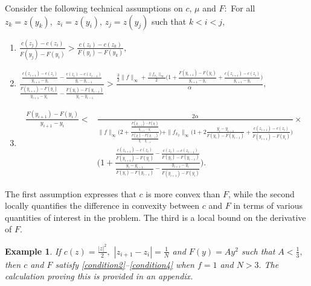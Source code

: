 \documentclass[12pt,reqno]{amsart}
\newtheorem{example}{Example}
\begin{document}
Consider the following  technical assumptions on $c$, $\mu$ and $F:$ 
For all $z_k=z(y_k),\,\,z_i=z(y_i),\,z_j=z(y_j)$ such that $k<  i< j,$ 
\begin{enumerate}[label={(H\arabic*)}]
\item \label{condition2} $ \frac{c(z_j)-c(z_i)}{F(y_j)-F(y_i)}>\frac{c(z_i)-c(z_k)}{F(y_i)-F(y_k)},$\vspace{3pt}
  \item \label{condition3} $\frac{\frac{c(z_{i+1})-c(z_i)}{y_{i+1}-y_i}-\frac{c(z_i)-c(z_
  {i-1})}{y_i-y_{i-1}}}{\frac{F(y_{i+1})-F(y_i)}{y_{i+1}-y_i}-\frac{F(y_i)-F(y_{i-1})}{y_i-y_{i-1}}}>\frac{\frac{3}{2}\|f\|_\infty+\frac{\|f_{x_1}\|_\infty}{2}\Big(1+\frac{F(y_{i+1})-F(y_i)}{y_{i+1}-y_i} +\frac{c(z_{i+1})-c(z_i)}{y_{i+1}-y_i}\Big)}{\alpha},$
  
   \item \label{condition4} 
   \[\begin{array}{ll}
   \frac{F(y_{i+1})-F(y_{i})}{y_{i+1}-y_{i}}<&  \frac{2\alpha}{\|f\|_\infty\Big(2+\frac{\frac{F(y_{i+1})-F(y_{i})}{y_{i+1}-y_{i}}}{\frac{F(y_i)-F(y_{i-1})}{y_i-y_{i-1}}}\Big)+\|f_{x_2}\|_\infty\Big(1+2\frac{y_{i}-y_{i-1}}{F(y_{i})-F(y_{i-1})}+\frac{c(z_{i+1})-c(z_i)}{F(y_{i+1})-F(y_i)}\Big)}\times\\
   &\Bigg(1+\frac{\frac{c(z_{i+1})-c(z_i)}{F(y_{i+1})-F(y_i)}-\frac{c(z_{i})-c(z_{i-1})}{F(y_i)-F(y_{i-1})}}{\frac{y_{i}-y_{i-1}}{F(y_{i})-F(y_{i-1})}-\frac{y_{i+1}-y_i}{F(y_{i+1})-F(y_{i})}}\Bigg).
   \end{array}\]


\end{enumerate}
The first assumption expresses that $c$ is more convex than $F$, while the second locally quantifies the difference in convexity between $c$ and $F$ in terms of various quantities of interest in the problem. The third is a local bound on the derivative of $F$.
\begin{example}\label{ex1}
 If $c(z)=\frac{|z|^2}{2},$ $|z_{i+1}-z_i|=\frac{1}{N}$ and  $F(y)=Ay^2$ such that $A<\frac{1}{3},$  then $c$ and $F$ satisfy \ref{condition2}--\ref{condition4} when $f=1$ and $N>3.$  The calculation proving this is provided in an appendix.


    
\end{example}
\end{document}
